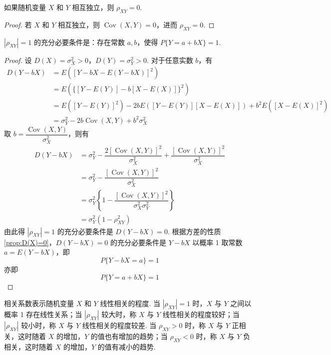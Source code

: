 \begin{property}
    如果随机变量 $X$ 和 $Y$ 相互独立，则 $\rho_{XY} = 0$.
\end{property}

\vspace{-1em}

\begin{proof}
    若 $X$ 和 $Y$ 相互独立，则 $\operatorname{Cov}(X,Y) = 0$，进而 $\rho_{XY} = 0$.
\end{proof}

\begin{property}
    $|\rho_{XY}|=1$ 的充分必要条件是：存在常数 $a,b$，使得 $P\{Y=a+bX\}=1$.
\end{property}

\begin{proof}
    设 $D(X) = \sigma_X^2 > 0$，$D(Y) = \sigma_Y^2 > 0$. 对于任意实数 $b$，有
    $$
    \begin{aligned}
        D(Y-bX) &= E([Y-bX - E(Y-bX)]^2) \\
        &= E( \{[Y-E(Y)] - b[X-E(X)]\}^2 ) \\
        &= E([Y-E(Y)]^2) - 2bE([Y-E(Y)][X-E(X)]) + b^2 E([X-E(X)]^2) \\
        &= \sigma_Y^2 - 2b \operatorname{Cov}(X,Y) + b^2 \sigma_X^2
    \end{aligned}
    $$
    取 $b = \dfrac{\operatorname{Cov}(X,Y)}{\sigma_X^2}$，则有
    $$
    \begin{aligned}
        D(Y-bX) &= \sigma_Y^2 - \dfrac{2 [\operatorname{Cov}(X,Y)]^2}{\sigma_X^2} + \dfrac{[\operatorname{Cov}(X,Y)]^2}{\sigma_X^2} \\
        &= \sigma_Y^2 - \dfrac{[\operatorname{Cov}(X,Y)]^2}{\sigma_X^2} \\
        &= \sigma_Y^2 \left\{ 1 - \dfrac{[\operatorname{Cov}(X,Y)]^2}{\sigma_X^2 \sigma_Y^2} \right\} \\
        &= \sigma_Y^2 (1 - \rho_{XY}^2)
    \end{aligned}
    $$
    由此得 $|\rho_{XY}|=1$ 的充分必要条件是 $D(Y-bX)=0$. 根据方差的性质\ref*{prop:D(X)=0}，$D(Y-bX)=0$ 的充分必要条件是 $Y-bX$ 以概率 1 取常数 $a=E(Y-bX)$，即
    $$
    P \{ Y-bX=a \} = 1
    $$
    亦即
    $$
    P\{Y=a+bX\}=1
    $$
\end{proof}

相关系数表示随机变量 $X$ 和 $Y$ 线性相关的程度. 当 $|\rho_{XY}|=1$ 时，$X$ 与 $Y$ 之间以概率 1 存在线性关系；当 $|\rho_{XY}|$ 较大时，称 $X$ 与 $Y$ 线性相关的程度较好；当 $|\rho_{XY}|$ 较小时，称 $X$ 与 $Y$ 线性相关的程度较差. 当 $\rho_{XY} > 0$ 时，称 $X$ 与 $Y$ 正相关，这时随着 $X$ 的增加，$Y$ 的值也有增加的趋势；当 $\rho_{XY} < 0$ 时，称 $X$ 与 $Y$ 负相关，这时随着 $X$ 的增加，$Y$ 的值有减小的趋势.

